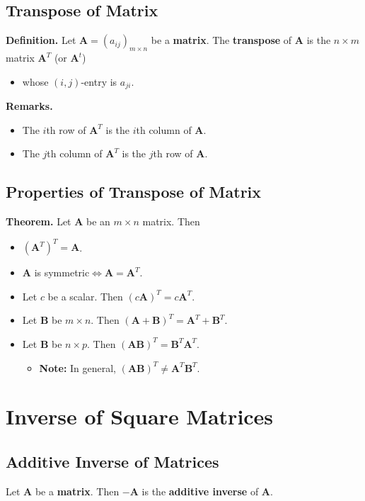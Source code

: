 \documentclass[../ma2001_notes.tex]{subfiles}
\begin{document}
\subsection{Transpose of Matrix}
\textbf{Definition.} Let \(\bm{A}=(a_{ij})_{m\times n}\) be a \textbf{matrix}. The \textbf{transpose} of \(\bm{A}\) is the \(n\times m\) matrix \(\bm{A}^T\) (or \(\bm{A}^t\))
\begin{itemize}
	\item whose \((i,j)\)-entry is \(a_{ji}\). 
\end{itemize}
\textbf{Remarks.}
\begin{itemize}
	\item The \(i\)th row of \(\bm{A}^T\) is the \(i\)th column of \(\bm{A}\).
	\item The \(j\)th column of \(\bm{A}^T\) is the \(j\)th row of \(\bm{A}\).
\end{itemize}

\subsection{Properties of Transpose of Matrix}
\textbf{Theorem.} Let \(\bm{A}\) be an \(m\times n\) matrix. Then
\begin{itemize}
	\item\((\bm{A}^T)^T=\bm{A}\).
	\item\(\bm{A}\) is symmetric\(\iff\bm{A}=\bm{A}^T\).
	\item Let \(c\) be a scalar. Then \((c\bm{A})^T=c\bm{A}^T\).
	\item Let \(\bm{B}\) be \(m\times n\). Then \((\bm{A}+\bm{B})^T=\bm{A}^T+\bm{B}^T\).
	\item Let \(\bm{B}\) be \(n\times p\). Then \((\bm{AB})^T=\bm{B}^T\bm{A}^T\).
	\begin{itemize}
		\item\textbf{Note:} In general, \((\bm{AB})^T\ne\bm{A}^T\bm{B}^T\).
	\end{itemize}
\end{itemize}

\section{Inverse of Square Matrices}
\subsection{Additive Inverse of Matrices}
Let \(\bm{A}\) be a \textbf{matrix}. Then \(-\bm{A}\) is the \textbf{additive inverse} of \(\bm{A}\).
\end{document}
